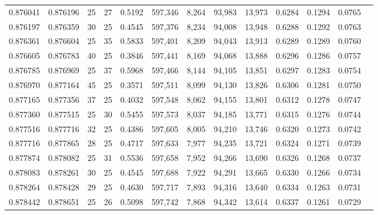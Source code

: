 \begin{tabular}{rrrrrrrrrrrrr}
0.876041 & 0.876196 &    25 &  27 &                                     0.5192 & 597,346 &   8,264 &  93,983 &  13,973 & 0.6284 & 0.1294 & 0.0765 \\
0.876197 & 0.876359 &    30 &  25 &                                     0.4545 & 597,376 &   8,234 &  94,008 &  13,948 & 0.6288 & 0.1292 & 0.0763 \\
0.876361 & 0.876604 &    25 &  35 &                                     0.5833 & 597,401 &   8,209 &  94,043 &  13,913 & 0.6289 & 0.1289 & 0.0760 \\
0.876605 & 0.876783 &    40 &  25 &                                     0.3846 & 597,441 &   8,169 &  94,068 &  13,888 & 0.6296 & 0.1286 & 0.0757 \\
0.876785 & 0.876969 &    25 &  37 &                                     0.5968 & 597,466 &   8,144 &  94,105 &  13,851 & 0.6297 & 0.1283 & 0.0754 \\
0.876970 & 0.877164 &    45 &  25 &                                     0.3571 & 597,511 &   8,099 &  94,130 &  13,826 & 0.6306 & 0.1281 & 0.0750 \\
0.877165 & 0.877356 &    37 &  25 &                                     0.4032 & 597,548 &   8,062 &  94,155 &  13,801 & 0.6312 & 0.1278 & 0.0747 \\
0.877360 & 0.877515 &    25 &  30 &                                     0.5455 & 597,573 &   8,037 &  94,185 &  13,771 & 0.6315 & 0.1276 & 0.0744 \\
0.877516 & 0.877716 &    32 &  25 &                                     0.4386 & 597,605 &   8,005 &  94,210 &  13,746 & 0.6320 & 0.1273 & 0.0742 \\
0.877716 & 0.877865 &    28 &  25 &                                     0.4717 & 597,633 &   7,977 &  94,235 &  13,721 & 0.6324 & 0.1271 & 0.0739 \\
0.877874 & 0.878082 &    25 &  31 &                                     0.5536 & 597,658 &   7,952 &  94,266 &  13,690 & 0.6326 & 0.1268 & 0.0737 \\
0.878083 & 0.878261 &    30 &  25 &                                     0.4545 & 597,688 &   7,922 &  94,291 &  13,665 & 0.6330 & 0.1266 & 0.0734 \\
0.878264 & 0.878428 &    29 &  25 &                                     0.4630 & 597,717 &   7,893 &  94,316 &  13,640 & 0.6334 & 0.1263 & 0.0731 \\
0.878442 & 0.878651 &    25 &  26 &                                     0.5098 & 597,742 &   7,868 &  94,342 &  13,614 & 0.6337 & 0.1261 & 0.0729 \\

\end{tabular}
